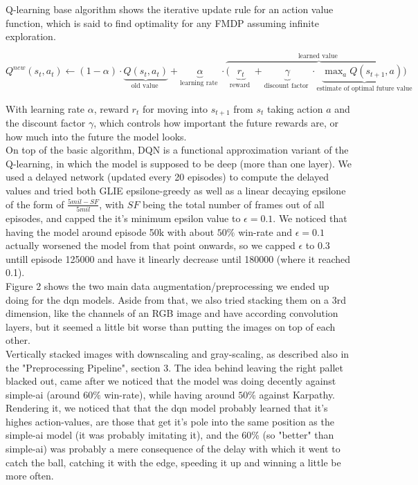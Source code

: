 
Q-learning base algorithm shows the iterative update rule for an action value function, which is said to find optimality for any FMDP assuming infinite exploration.


$Q^{n e w}\left(s_{t}, a_{t}\right) \leftarrow(1-\alpha) \cdot \underbrace{Q\left(s_{t}, a_{t}\right)}_{\text {old value }}+\underbrace{\alpha}_{\text {learning rate }} \cdot \overbrace{(\underbrace{r_{t}}_{\text {reward }} +  \underbrace{\gamma}_{\text {discount factor }}\cdot \underbrace{\max_{a}Q\left(s_{t+1}, a\right))}_{\text{estimate of optimal future value}}}^{\text {learned value }}$

\noindent
With learning rate $\alpha$, reward $r_t$ for moving into $s_{t+1}$ from $s_t$ taking action $a$ and the discount factor $\gamma$, which controls how important the future rewards are, or how much into the future the model looks.\\

\noindent
On top of the basic algorithm, DQN is a functional approximation variant of the Q-learning, in which the model is supposed to be deep (more than one layer). We used a delayed network (updated every 20 episodes) to compute the delayed values and tried both GLIE epsilone-greedy as well as a linear decaying epsilone of the form of $\frac{5mil-SF}{5mil}$, with $SF$ being the total number of frames out of all episodes, and capped the it's minimum epsilon value to $\epsilon=0.1$. We noticed that having the model around episode 50k with about $50\%$ win-rate and $\epsilon=0.1$ actually worsened the model from that point onwards, so we capped $\epsilon$ to 0.3 untill episode 125000 and have it linearly decrease until 180000 (where it reached 0.1).\\


\noindent
Figure 2 shows the two main data augmentation/preprocessing we ended up doing for the dqn models. Aside from that, we also tried stacking them on a 3rd dimension, like the channels of an RGB image and have according convolution layers, but it seemed a little bit worse than putting the images on top of each other. \\

\noindent
Vertically stacked images with downscaling and gray-scaling, as described also in the "Preprocessing Pipeline", section 3. The idea behind leaving the right pallet blacked out, came after we noticed that the model was doing decently against simple-ai (around $60\%$ win-rate), while having around $50\%$ against Karpathy. Rendering it, we noticed that that the dqn model probably learned that it's highes action-values, are those that get it's pole into the same position as the simple-ai model (it was probably imitating it), and the 60\% (so "better" than simple-ai) was probably a mere consequence of the delay with which it went to catch the ball, catching it with the edge, speeding it up and winning a little be more often.\\

